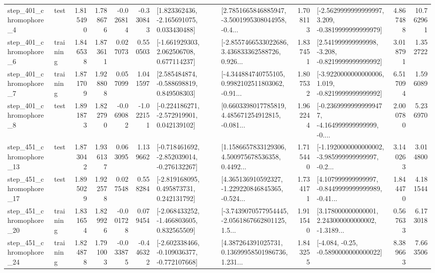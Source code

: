 \begin{tabular}{llrrrrllrlrr}
   step\_401\_chromophore\_4 &      test &      1.815490 &    1.788676 &     -0.026814 & -0.330843 &    [1.823362436, -2.165691075, 0.033430488] &  [2.7851665846885947, -3.5001995308044958, -0.4... &       1.708113 &  [-2.5629999999999997, 3.209, -0.3819999999999979] &            4.867488 &         10.762961 \\
   step\_401\_chromophore\_6 &  training &      1.846538 &    1.873611 &      0.027073 &  0.550503 &    [-1.661929303, 2.062506708, 0.677114237] &  [-2.8557466533022686, 3.436833362588726, 0.926... &       1.837451 &   [2.541999999999998, -3.208, -0.8219999999999992] &            3.018791 &          1.352722 \\
   step\_401\_chromophore\_7 &  training &      1.871709 &    1.928808 &      0.057099 &  1.041597 &    [2.585484874, -0.588698819, 0.849508303] &  [-4.344884740755105, 0.9982102511803062, -0.91... &       1.807532 &  [-3.9220000000000006, 1.019, -0.8219999999999992] &            6.517094 &          1.596089 \\
   step\_401\_chromophore\_8 &      test &      1.891873 &    1.822790 &     -0.069082 & -1.022151 &   [-0.224186271, -2.572919901, 0.042139102] &  [0.6603398017785819, 4.485671254912815, -0.081... &       1.962244 &  [-0.23699999999999477, -4.164999999999999, -0.... &            2.000780 &          5.236970 \\
  step\_451\_chromophore\_13 &      test &      1.873042 &    1.936137 &      0.063095 &  1.139662 &  [-0.718461692, -2.852039014, -0.276132267] &  [1.1586657833129306, 4.500975678536358, 0.4492... &       1.715440 &  [-1.1920000000000002, -3.985999999999997, -0.2... &            3.140263 &          3.014800 \\
  step\_451\_chromophore\_17 &      test &      1.895029 &    1.922578 &      0.027548 &  0.558284 &    [-2.819168095, 0.495873731, 0.242131792] &  [4.365136910592327, -1.229220846845365, -0.524... &       1.734171 &  [4.107999999999997, -0.8449999999999989, -0.41... &            1.844470 &          4.181544 \\
  step\_451\_chromophore\_20 &  training &      1.831654 &    1.829926 &     -0.001728 &  0.079454 &   [-2.068433252, -1.466803605, 0.832565509] &  [-3.7439070577954445, -2.0561867662801125, 1.5... &       1.911540 &  [3.178000000000001, 2.243000000000002, -1.3189... &            0.567633 &          6.173018 \\
  step\_451\_chromophore\_24 &  training &      1.824878 &    1.791003 &     -0.033875 & -0.446322 &  [-2.602338466, -0.109036377, -0.772107668] &  [4.387264391025731, 0.13699958501986736, 1.231... &       1.843255 &               [-4.084, -0.25, -0.5890000000000022] &            8.389663 &          7.663506 \\

\end{tabular}
